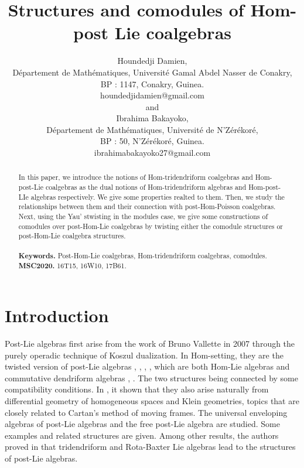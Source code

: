 \documentclass{article}
\title{Structures and comodules of Hom-post Lie
coalgebras }
\author{Houndedji Damien, \\ D\'epartement de Math\'ematiques, Universit\'e Gamal Abdel Nasser de Conakry,\\
BP : 1147, Conakry, Guinea.\\
houndedjidamien@gmail.com\\
and\\
Ibrahima Bakayoko,\\ D\'epartement de Math\'ematiques, Universit\'e de N'Z\'er\'ekor\'e,\\
BP : 50, N'Z\'er\'ekor\'e, Guinea.\\
ibrahimabakayoko27@gmail.com
}
\date{}
\theoremstyle{definition}
\theoremstyle{remark}
\numberwithin{equation}{section}
\begin{document}
\maketitle
\begin{abstract}
In this paper, we introduce the notions of Hom-tridendriform coalgebras and Hom-post-Lie coalgebras as the
dual notions of Hom-tridendriform algebras and Hom-post-LIe algebras respectively. We give some properties realted to them. Then, we study the relationships between them and their connection with post-Hom-Poisson coalgebras. Next, using the Yau' stwisting in the modules case, we give some constructions of  comodules over post-Hom-Lie coalgebras by twisting either the comodule structures or post-Hom-Lie coalgebra structures.
\\
\\
{
{\bf Keywords.}
Post-Hom-Lie coalgebras, Hom-tridendriform coalgebras, comodules.}\\
{\bf  MSC2020.}  16T15, 16W10, 17B61.
\end{abstract}

\section{Introduction}
Post-Lie algebras first arise from the work of Bruno Vallette \cite{BV} in 2007 through the purely operadic technique of Koszul dualization. In Hom-setting, they are the twisted version of post-Lie algebras \cite{BV}, \cite{BOL}, \cite{XC}, \cite{YC},
 which are both Hom-Lie algebras and commutative dendriform algebras \cite{JL1}, \cite{JL2}.
The two structures being connected by some compatibility conditions.
In \cite{ML}, it shown that they also arise naturally from differential geometry of homogeneous spaces and Klein geometries, topics that are
closely related to Cartan's method of moving frames. The universal
enveloping algebras of post-Lie algebras and the free post-Lie algebra are studied. Some examples and related structures are given.
Among other results, the authors proved in \cite{CLX} that tridendriform and Rota-Baxter Lie algebras lead to the structures of
post-Lie algebras.
\end{document}

